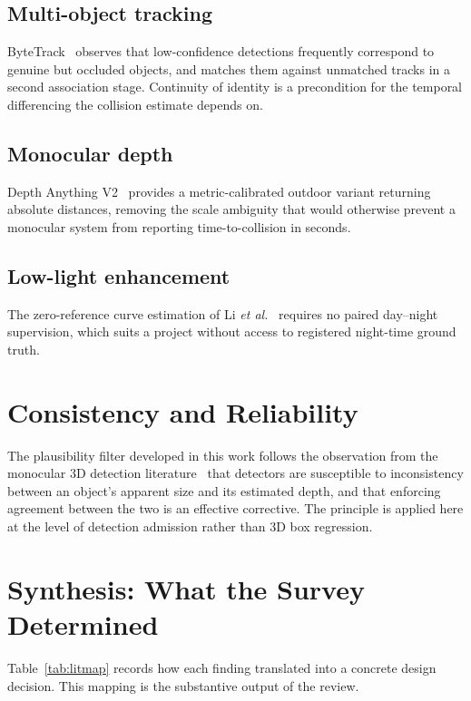 \documentclass[11pt,a4paper]{report}
\begin{document}
\subsection{Multi-object tracking}

ByteTrack~\cite{zhang2022bytetrack} observes that low-confidence detections
frequently correspond to genuine but occluded objects, and matches them against
unmatched tracks in a second association stage. Continuity of identity is a
precondition for the temporal differencing the collision estimate depends on.

\subsection{Monocular depth}

Depth Anything V2~\cite{yang2024depthv2} provides a metric-calibrated outdoor
variant returning absolute distances, removing the scale ambiguity that would
otherwise prevent a monocular system from reporting time-to-collision in
seconds.

\subsection{Low-light enhancement}

The zero-reference curve estimation of Li \textit{et al.}~\cite{li2021zerodce}
requires no paired day--night supervision, which suits a project without access
to registered night-time ground truth.

\section{Consistency and Reliability}

The plausibility filter developed in this work follows the observation from the
monocular 3D detection literature~\cite{lian2022geoconsistency} that detectors
are susceptible to inconsistency between an object's apparent size and its
estimated depth, and that enforcing agreement between the two is an effective
corrective. The principle is applied here at the level of detection admission
rather than 3D box regression.

\section{Synthesis: What the Survey Determined}

Table~\ref{tab:litmap} records how each finding translated into a concrete
design decision. This mapping is the substantive output of the review.
\end{document}
